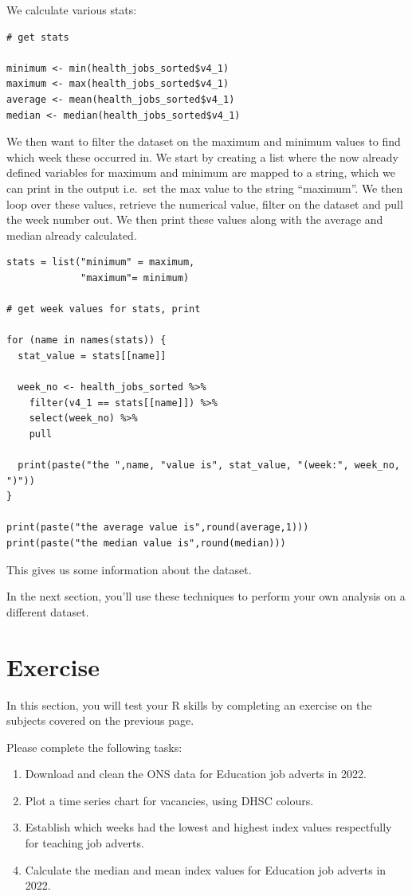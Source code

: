 \documentclass[
]{book}
\begin{document}
We calculate various stats:

\begin{verbatim}
# get stats

minimum <- min(health_jobs_sorted$v4_1)
maximum <- max(health_jobs_sorted$v4_1)
average <- mean(health_jobs_sorted$v4_1)
median <- median(health_jobs_sorted$v4_1)
\end{verbatim}

We then want to filter the dataset on the maximum and minimum values to find which week these occurred in. We start by creating a list where the now already defined variables for maximum and minimum are mapped to a string, which we can print in the output i.e.~set the max value to the string ``maximum''. We then loop over these values, retrieve the numerical value, filter on the dataset and pull the week number out. We then print these values along with the average and median already calculated.

\begin{verbatim}
stats = list("minimum" = maximum,
             "maximum"= minimum)

# get week values for stats, print

for (name in names(stats)) {
  stat_value = stats[[name]]

  week_no <- health_jobs_sorted %>%
    filter(v4_1 == stats[[name]]) %>%
    select(week_no) %>%
    pull

  print(paste("the ",name, "value is", stat_value, "(week:", week_no, ")"))
}

print(paste("the average value is",round(average,1)))
print(paste("the median value is",round(median)))
\end{verbatim}

This gives us some information about the dataset.

In the next section, you'll use these techniques to perform your own analysis on a different dataset.

\hypertarget{exercise}{%
\chapter{Exercise}\label{exercise}}

In this section, you will test your R skills by completing an exercise on the subjects covered on the previous page.

Please complete the following tasks:

\begin{enumerate}
\def\labelenumi{\arabic{enumi}.}
\item
  Download and clean the ONS data for Education job adverts in 2022.
\item
  Plot a time series chart for vacancies, using DHSC colours.
\item
  Establish which weeks had the lowest and highest index values respectfully for teaching job adverts.
\item
  Calculate the median and mean index values for Education job adverts in 2022.
\end{enumerate}

  
\end{document}
